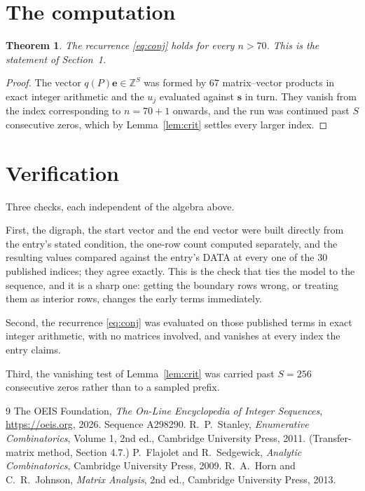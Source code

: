 \documentclass[11pt,a4paper]{article}
\theoremstyle{plain}
\newtheorem{theorem}{Theorem}
\theoremstyle{definition}
\begin{document}
\section{The computation}

\begin{theorem}
The recurrence \eqref{eq:conj} holds for every $n>70$. This is the statement of
Section~1.
\end{theorem}

\begin{proof}
The vector $q(P)\mathbf{e}\in\mathbb{Z}^{S}$ was formed by $67$ matrix--vector
products in exact integer arithmetic and the $u_j$ evaluated against $\mathbf{s}$ in turn.
They vanish from the index corresponding to $n=70+1$ onwards, and the run was continued
past $S$ consecutive zeros, which by Lemma~\ref{lem:crit} settles every larger index.
\end{proof}

\section{Verification}

Three checks, each independent of the algebra above.

First, the digraph, the start vector and the end vector were built directly from the
entry's stated condition, the one-row count computed separately, and the resulting values
compared against the entry's DATA at every one of the $30$ published indices; they
agree exactly. This is the check that ties the model to the sequence, and it is a sharp one:
getting the boundary rows wrong, or treating them as interior rows, changes the early terms
immediately.

Second, the recurrence \eqref{eq:conj} was evaluated on those published terms in exact
integer arithmetic, with no matrices involved, and vanishes at every index the entry claims.

Third, the vanishing test of Lemma~\ref{lem:crit} was carried past $S=256$ consecutive
zeros rather than to a sampled prefix.

\begin{thebibliography}{9}
 The OEIS Foundation, \emph{The On-Line Encyclopedia of Integer
Sequences}, \url{https://oeis.org}, 2026. Sequence A298290.
 R.~P.~Stanley, \emph{Enumerative Combinatorics}, Volume 1, 2nd ed.,
Cambridge University Press, 2011. (Transfer-matrix method, Section 4.7.)
 P.~Flajolet and R.~Sedgewick, \emph{Analytic Combinatorics}, Cambridge
University Press, 2009.
 R.~A.~Horn and C.~R.~Johnson, \emph{Matrix Analysis}, 2nd ed., Cambridge
University Press, 2013.
\end{thebibliography}
\end{document}
